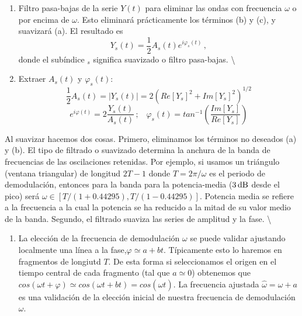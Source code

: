 \documentclass[
]{agujournal2019}
\providecommand{\tightlist}{%
  \setlength{\itemsep}{0pt}\setlength{\parskip}{0pt}}\usepackage{longtable,booktabs,array}
\begin{document}
\begin{enumerate}
\def\labelenumi{(\arabic{enumi})}
\setcounter{enumi}{1}
\item
  Filtro pasa-bajas de la serie \(Y(t)\) para eliminar las ondas con
  frecuencia \(\omega\) o por encima de \(\omega\). Esto eliminará
  prácticamente los términos (b) y (c), y suavizará (a). El resultado es
  \[Y_s(t)=\frac{1}{2}A_s(t)e^{i\varphi_s(t)}\,,\] donde el subíndice
  \(_s\) significa suavizado o filtro pasa-bajas. \textbackslash{}
\item
  Extraer \(A_s(t)\) y \(\varphi_s(t)\):
  \[\frac{1}{2}A_s(t)=|Y_s(t)|=2\left( Re[Y_s]^2 + Im[Y_s]^2\right)^{1/2}\]
  \[e^{i\varphi(t)}=2\frac{Y_s(t)}{A_s(t)}\,;\,\,\,\,\,\varphi_s(t)=tan^{-1}\left(\frac{Im[Y_s]}{Re[Y_s]}\right)\]
\end{enumerate}

Al suavizar hacemos dos cosas. Primero, eliminamos los términos no
deseados (a) y (b). El tipo de filtrado o suavizado determina la anchura
de la banda de frecuencias de las oscilaciones retenidas. Por ejemplo,
si usamos un triángulo (ventana triangular) de longitud \(2T-1\) donde
\(T=2\pi/\omega\) es el periodo de demodulación, entonces para la banda
para la potencia-media (\(3\,{\rm dB}\) desde el pico) será
\(\omega \in [T/(1+0.44295),T/(1-0.44295)]\). Potencia media se refiere
a la frecuencia a la cual la potencia se ha reducido a la mitad de su
valor medio de la banda. Segundo, el filtrado suaviza las series de
amplitud y la fase. \textbackslash{}

\begin{enumerate}
\def\labelenumi{(\arabic{enumi})}
\setcounter{enumi}{3}
\tightlist
\item
  La elección de la frecuencia de demodulación \(\omega\) se puede
  validar ajustando localmente una línea a la
  fase,\(\varphi\simeq a + bt\). Típicamente esto lo haremos en
  fragmentos de longiutd \(T\). De esta forma si seleccionamos el origen
  en el tiempo central de cada fragmento (tal que \(a\simeq 0\))
  obtenemos que
  \(cos(\omega t + \varphi)\simeq cos(\omega t + bt)=cos(\hat{\omega} t)\).
  La frecuencia ajustada \(\hat{\omega}=\omega + a\) es una validación
  de la elección inicial de nuestra frecuencia de demodulación
  \(\omega\).

  \begin{center}
  \end{center}
\end{enumerate}
\end{document}
